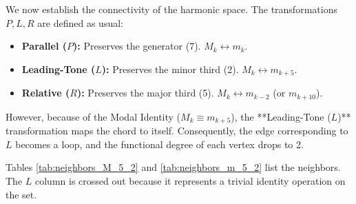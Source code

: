 \documentclass[12pt,letterpaper]{amsart}
\begin{document}
We now establish the connectivity of the harmonic space. The transformations $P, L, R$ are defined as usual:
\begin{itemize}
    \item \textbf{Parallel ($P$):} Preserves the generator (7). $M_k \leftrightarrow m_k$.
    \item \textbf{Leading-Tone ($L$):} Preserves the minor third (2). $M_k \leftrightarrow m_{k+5}$.
    \item \textbf{Relative ($R$):} Preserves the major third (5). $M_k \leftrightarrow m_{k-2}$ (or $m_{k+10}$).
\end{itemize}

However, because of the Modal Identity ($M_k \equiv m_{k+5}$), the **Leading-Tone ($L$)** transformation maps the chord to itself. Consequently, the edge corresponding to $L$ becomes a loop, and the functional degree of each vertex drops to 2.

Tables \ref{tab:neighbors_M_5_2} and \ref{tab:neighbors_m_5_2} list the neighbors. The $L$ column is crossed out because it represents a trivial identity operation on the set.
\end{document}

